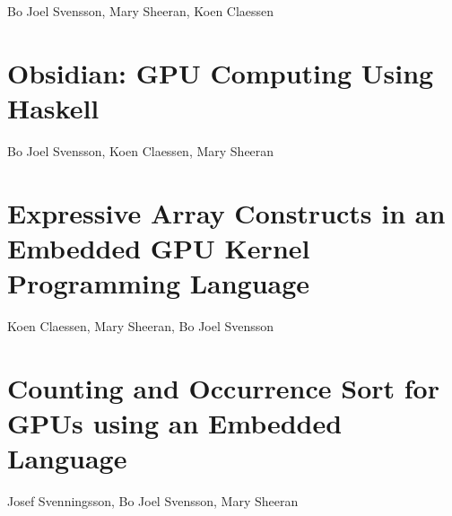 \documentclass[a4paper]{book}
\begin{document}
\begin{center} 
Bo Joel Svensson, Mary Sheeran, Koen Claessen
\end{center}



% 
\cleardoublepage 

\section{Obsidian: GPU Computing Using Haskell}

\begin{center} 
Bo Joel Svensson, Koen Claessen, Mary Sheeran
\end{center}




% 
\cleardoublepage 

\section{Expressive Array Constructs in an Embedded GPU Kernel Programming Language}

\begin{center} 
Koen Claessen, Mary Sheeran, Bo Joel Svensson
\end{center}



% 
\cleardoublepage 

\section{Counting and Occurrence Sort for GPUs using an Embedded Language}

\begin{center} 
Josef Svenningsson, Bo Joel Svensson, Mary Sheeran 
\end{center}
\end{document}
